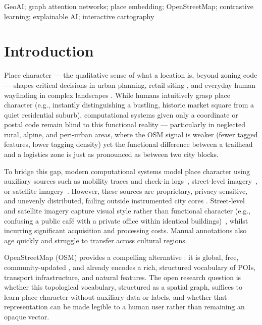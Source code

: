 \documentclass[]{interact}
\theoremstyle{plain}%
\theoremstyle{definition}
\theoremstyle{remark}
\begin{document}
\begin{keywords}
GeoAI; graph attention networks; place embedding; OpenStreetMap; contrastive learning; explainable AI; interactive cartography
\end{keywords}

\section{Introduction}

Place character --- the qualitative sense of what a location is, beyond zoning code \citep{tuan1977space} --- shapes critical decisions in urban planning, retail siting \citep{Montgomery01021998}, and everyday human wayfinding in complex landscapes \citep{lynch1960image}. 
While humans intuitively grasp place character (e.g., instantly distinguishing a bustling, historic market square from a quiet residential suburb), computational systems given only a coordinate or postal code remain blind to this functional reality --- particularly in neglected rural, alpine, and peri-urban areas, where the OSM signal is weaker (fewer tagged features, lower tagging density) yet the functional difference between a trailhead and a logistics zone is just as pronounced as between two city blocks.

To bridge this gap, modern computational systems model place character using auxiliary sources such as mobility traces and check-in logs~\citep{place2vec, cheng2011exploring}, street-level imagery~\citep{urban2vec}, or satellite imagery~\citep{tile2vec}. However, these sources are proprietary, privacy-sensitive, and unevenly distributed, failing outside instrumented city cores \citep{Fonte-2017}. Street-level and satellite imagery capture visual style rather than functional character (e.g., confusing a public café with a private office within identical buildings)~\citep{10.1145/2830541}, whilst incurring significant acquisition and processing costs. Manual annotations also age quickly and struggle to transfer across cultural regions.

OpenStreetMap (OSM) provides a compelling alternative \citep{10.1109/MPRV.2008.80}: it is global, free, community-updated \citep{goodchild2007citizens}, and already encodes a rich, structured vocabulary of POIs, transport infrastructure, and natural features. The open research question is whether this topological vocabulary, structured as a spatial graph, suffices to learn place character without auxiliary data or labels, and whether that representation can be made legible to a human user rather than remaining an opaque vector.
\end{document}
